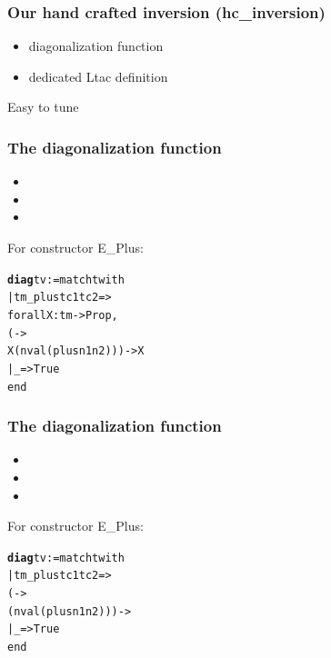 \documentclass[usenames,dvipsnames]{beamer} %
\begin{document}
\begin{frame}
\frametitle{Our hand crafted inversion (hc\_inversion)}
\large
\begin{itemize}
\item diagonalization function
\item dedicated Ltac definition 
\end{itemize}
\bigskip
Easy to tune
\end{frame}

\begin{frame}[fragile]
\frametitle{The diagonalization function}
\begin{itemize}
\item {}
\item %
\item %
\end{itemize}
For constructor E\_Plus:
\begin{alltt}
\textbf{diag} t v := match t with
  | tm_plus tc1 tc2 =>
      forall X: tm -> Prop,
        ( -> 
                  X (nval (plus n1 n2))) -> X 
  | _ => True
end
\end{alltt}
\end{frame}

\begin{frame}[fragile]
\frametitle{The diagonalization function}
\begin{itemize}
\item {}
\item {}
\item %
\end{itemize}
For constructor E\_Plus:
\begin{alltt}
\textbf{diag} t v := match t with
  | tm_plus tc1 tc2 =>
        ( -> 
                   (nval (plus n1 n2))) ->  
  | _ => True
end
\end{alltt}
\end{frame}
\end{document}
